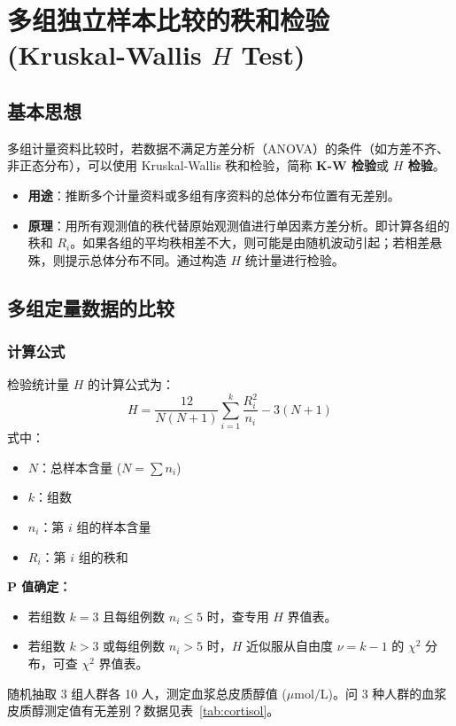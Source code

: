 \documentclass[lang=cn,10pt]{elegantbook}
\begin{document}
\section{多组独立样本比较的秩和检验 (Kruskal-Wallis $H$ Test)}

\subsection{基本思想}
多组计量资料比较时，若数据不满足方差分析（ANOVA）的条件（如方差不齐、非正态分布），可以使用 Kruskal-Wallis 秩和检验，简称 \textbf{K-W 检验}或 \textbf{$H$ 检验}。
\begin{itemize}
    \item \textbf{用途}：推断多个计量资料或多组有序资料的总体分布位置有无差别。
    \item \textbf{原理}：用所有观测值的秩代替原始观测值进行单因素方差分析。即计算各组的秩和 $R_i$。如果各组的平均秩相差不大，则可能是由随机波动引起；若相差悬殊，则提示总体分布不同。通过构造 $H$ 统计量进行检验。
\end{itemize}

\subsection{多组定量数据的比较}

\subsubsection{计算公式}
检验统计量 $H$ 的计算公式为：
\[
H = \frac{12}{N(N+1)} \sum_{i=1}^{k} \frac{R_i^2}{n_i} - 3(N+1)
\]
式中：
\begin{itemize}
    \item $N$：总样本含量 ($N = \sum n_i$)
    \item $k$：组数
    \item $n_i$：第 $i$ 组的样本含量
    \item $R_i$：第 $i$ 组的秩和
\end{itemize}

\textbf{P 值确定：}
\begin{itemize}
    \item 若组数 $k=3$ 且每组例数 $n_i \le 5$ 时，查专用 $H$ 界值表。
    \item 若组数 $k>3$ 或每组例数 $n_i > 5$ 时，$H$ 近似服从自由度 $\nu = k-1$ 的 $\chi^2$ 分布，可查 $\chi^2$ 界值表。
\end{itemize}

\vspace{0.2cm}
\begin{exercise}
随机抽取 3 组人群各 10 人，测定血浆总皮质醇值 ($\mu\mathrm{mol}/\mathrm{L}$)。问 3 种人群的血浆皮质醇测定值有无差别？数据见表~\ref{tab:cortisol}。
\end{exercise}
\end{document}

